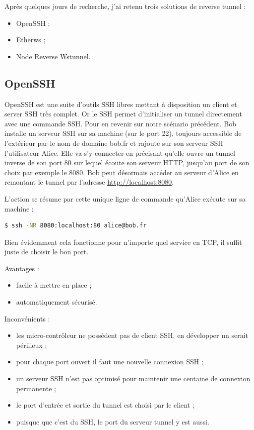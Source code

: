 Après quelques jours de recherche, j'ai retenu trois solutions de
reverse tunnel :
\begin{itemize}
    \item OpenSSH ;
    \item Etherws ;
    \item Node Reverse Wstunnel.
\end{itemize}

\subsection{OpenSSH}

OpenSSH est une suite d'outils SSH libres mettant à disposition un
client et server SSH très complet. Or le SSH permet d'initialiser un
tunnel directement avec une commande SSH. Pour en revenir sur notre
scénario précédent. Bob installe un serveur SSH sur sa machine (sur le
port 22), toujours accessible de l'extérieur par le nom de domaine
bob.fr et rajoute sur son serveur SSH l'utilisateur Alice. Elle va s'y
connecter en précisant qu'elle ouvre un tunnel inverse de son port 80
sur lequel écoute son serveur HTTP, jusqu'au port de son choix par
exemple le 8080. Bob peut désormais accéder au serveur d'Alice en
remontant le tunnel par l'adresse \url{http://localhost:8080}.

L'action se résume par cette unique ligne de commande qu'Alice exécute
sur sa machine :
\begin{lstlisting}[language=bash]
  $ ssh -NR 8080:localhost:80 alice@bob.fr
\end{lstlisting}%

Bien évidemment cela fonctionne pour n'importe quel service en TCP, il
suffit juste de choisir le bon port.

Avantages :
\begin{itemize}
\item facile à mettre en place ;
\item automatiquement sécurisé.
\end{itemize}

Inconvénients :
\begin{itemize}
\item les micro-contrôleur ne possèdent pas de client SSH, en
  développer un serait périlleux ;
\item pour chaque port ouvert il faut une nouvelle connexion SSH ;
\item un serveur SSH n'est pas optimisé pour maintenir une centaine de
  connexion permanente ;
\item le port d'entrée et sortie du tunnel est choisi par le client ;
\item puisque que c'est du SSH, le port du serveur tunnel y est aussi.
\end{itemize}

